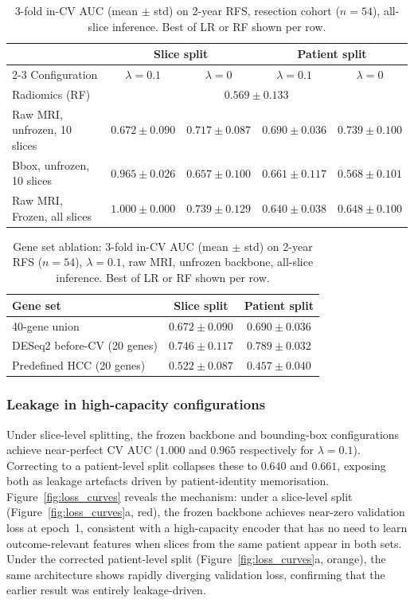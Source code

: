 \documentclass[12pt,twoside]{report}
\begin{document}
\begin{table}[ht]
\centering
\small
\caption{3-fold in-CV AUC (mean $\pm$ std) on 2-year RFS, resection cohort ($n=54$),
all-slice inference. Best of LR or RF shown per row.}
\label{tab:multimodal_cv}
\begin{tabular}{lcccc}
\hline
 & \multicolumn{2}{c}{Slice split} & \multicolumn{2}{c}{Patient split} \\
\cline{2-3}\cline{4-5}
Configuration & $\lambda=0.1$ & $\lambda=0$ & $\lambda=0.1$ & $\lambda=0$ \\
\hline
Radiomics (RF) & \multicolumn{4}{c}{$0.569 \pm 0.133$} \\
\hline
Raw MRI, unfrozen, 10 slices & $0.672 \pm 0.090$ & $0.717 \pm 0.087$ & $0.690 \pm 0.036$ & $0.739 \pm 0.100$ \\
Bbox, unfrozen, 10 slices    & $0.965 \pm 0.026$ & $0.657 \pm 0.100$ & $0.661 \pm 0.117$ & $0.568 \pm 0.101$ \\
Raw MRI, Frozen, all slices   & $1.000 \pm 0.000$ & $0.739 \pm 0.129$ & $0.640 \pm 0.038$ & $0.648 \pm 0.100$ \\
\hline
\end{tabular}
\end{table}

\begin{table}[ht]
\centering
\small
\caption{Gene set ablation: 3-fold in-CV AUC (mean $\pm$ std) on 2-year RFS ($n=54$),
$\lambda=0.1$, raw MRI, unfrozen backbone, all-slice inference. Best of LR or RF shown per row.}
\label{tab:gene_ablation}
\begin{tabular}{lcc}
\hline
Gene set & Slice split & Patient split \\
\hline
40-gene union           & $0.672 \pm 0.090$ & $0.690 \pm 0.036$ \\
DESeq2 before-CV (20 genes) & $0.746 \pm 0.117$ & ${0.789 \pm 0.032}$ \\
Predefined HCC (20 genes)   & $0.522 \pm 0.087$ & $0.457 \pm 0.040$ \\
\hline
\end{tabular}
\end{table}

\subsubsection*{Leakage in high-capacity configurations}

Under slice-level splitting, the frozen backbone and bounding-box configurations
achieve near-perfect CV AUC ($1.000$ and $0.965$ respectively for $\lambda=0.1$).
Correcting to a patient-level split collapses these to $0.640$ and $0.661$, exposing both as leakage artefacts driven by
patient-identity memorisation.
Figure~\ref{fig:loss_curves} reveals the mechanism: under a slice-level split
(Figure~\ref{fig:loss_curves}a, red), the frozen backbone achieves near-zero validation loss
at epoch~1, consistent with a high-capacity encoder that has no need to learn
outcome-relevant features when slices from the same patient appear in both sets.
Under the corrected patient-level split (Figure~\ref{fig:loss_curves}a, orange), the same
architecture shows rapidly diverging validation loss, confirming that the earlier result
was entirely leakage-driven.
\end{document}
